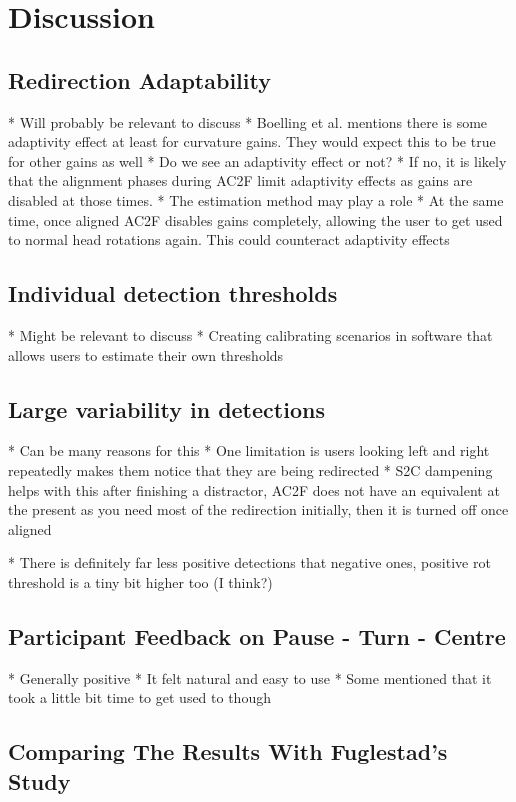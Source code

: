 \section{Discussion}



\subsection{Redirection Adaptability}
* Will probably be relevant to discuss
* Boelling et al. mentions there is some adaptivity effect at least for curvature gains. They would expect this to be true for other gains as well
* Do we see an adaptivity effect or not?
   * If no, it is likely that the alignment phases during AC2F limit adaptivity effects as gains are disabled at those times.
* The estimation method may play a role
* At the same time, once aligned AC2F disables gains completely, allowing the user to get used to normal head rotations again. This could counteract adaptivity effects

\subsection{Individual detection thresholds}
* Might be relevant to discuss
* Creating calibrating scenarios in software that allows users to estimate their own thresholds

\subsection{Large variability in detections}
* Can be many reasons for this
* One limitation is users looking left and right repeatedly makes them notice that they are being redirected
* S2C dampening helps with this after finishing a distractor, AC2F does not have an equivalent at the present as you need most of the redirection initially, then it is turned off once aligned


* There is definitely far less positive detections that negative ones, positive rot threshold is a tiny bit higher too (I think?)

\subsection{Participant Feedback on Pause - Turn - Centre}
* Generally positive
* It felt natural and easy to use
* Some mentioned that it took a little bit time to get used to though

\subsection{Comparing The Results With Fuglestad's Study}
